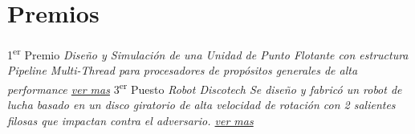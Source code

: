 \documentclass[11pt,a4paper,sans]{moderncv}  %
\begin{document}
\section{Premios}
                {1\textsuperscript{er} Premio} {}{}{\em{Diseño y Simulación de una Unidad de Punto Flotante con estructura Pipeline Multi-Thread para procesadores de propósitos generales de alta performance} \em \href{http://disenioconingenio.com.ar/shop/docs/i+d_itba_2002.pdf}{ver mas}}
  {3\textsuperscript{er} Puesto} {}{}{\em{Robot Discotech} \newline \em{Se diseño y fabricó un robot de lucha basado en un disco giratorio de alta velocidad de rotación con 2 salientes filosas que impactan contra el adversario. \href{http://disenioconingenio.com.ar/producto.php?products_id=378}{ver mas}}}
\end{document}
